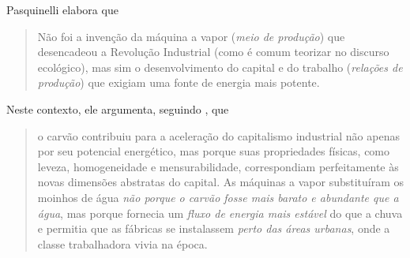 Pasquinelli elabora que
\begin{quote}
Não foi a invenção da máquina a vapor (\emph{meio de produção}) que desencadeou a Revolução Industrial (como é comum teorizar no discurso ecológico), mas sim o desenvolvimento do capital e do trabalho (\emph{relações de produção}) que exigiam uma fonte de energia mais potente. \parencite[p. 107]{Pasquinelli2023}
\end{quote}

Neste contexto, ele argumenta, seguindo \textcite{Malm2016}, que
\begin{quote}
o carvão contribuiu para a aceleração do capitalismo industrial não apenas por seu potencial energético, mas porque suas propriedades físicas, como leveza, homogeneidade e mensurabilidade, correspondiam perfeitamente às novas dimensões abstratas do capital. As máquinas a vapor substituíram os moinhos de água \emph{não porque o carvão fosse mais barato e abundante que a água}, mas porque fornecia um \emph{fluxo de energia mais estável} do que a chuva e permitia que as fábricas se instalassem \emph{perto das áreas urbanas}, onde a classe trabalhadora vivia na época. \parencite[p. 122-3, grifo meu]{Pasquinelli2023}
\end{quote}

